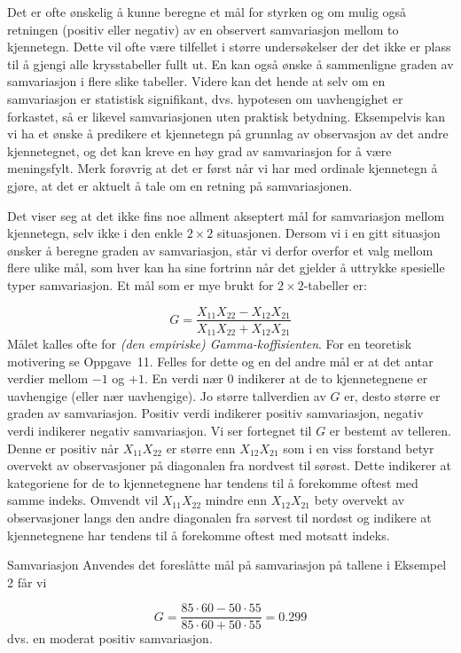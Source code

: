 Det er ofte ønskelig å kunne beregne et mål for styrken og om
mulig også retningen (positiv eller negativ) av en observert 
samvariasjon mellom to kjennetegn.  Dette vil ofte være tilfellet i
større undersøkelser der det ikke er plass til å gjengi alle
krysstabeller fullt ut.  En kan også ønske å sammenligne graden 
av samvariasjon i flere slike tabeller.  Videre kan det hende at selv om
en samvariasjon er statistisk signifikant, dvs. hypotesen om
uavhengighet er forkastet, så er likevel samvariasjonen uten
praktisk betydning.  Eksempelvis kan vi ha et ønske å predikere
et kjennetegn på grunnlag av observasjon av det andre kjennetegnet,
og det kan kreve en høy grad av samvariasjon for å være 
meningsfylt.  Merk forøvrig at det er først når vi har med
ordinale kjennetegn å gjøre, at det er aktuelt å tale om en
retning på samvariasjonen.

Det viser seg at det ikke fins noe allment akseptert mål for 
samvariasjon mellom kjennetegn, selv ikke i den enkle $2\times 2$
situasjonen.  Dersom vi i en gitt situasjon ønsker å beregne
graden av samvariasjon, står vi derfor overfor et valg mellom flere ulike
mål, som hver kan ha sine fortrinn når det gjelder å uttrykke
spesielle typer samvariasjon.  Et mål som er mye brukt for
$2\times 2$-tabeller er:

\[ G=\frac{X_{11}X_{22}-X_{12}X_{21}}{X_{11}X_{22}+X_{12}X_{21}} \]
Målet kalles ofte for {\em (den empiriske) Gamma-koffisienten}. For en
teoretisk motivering se Oppgave~11.  Felles for dette og en del andre
mål er at det antar verdier mellom $-1$ og $+1$.  En verdi nær
0 indikerer at de to kjennetegnene er uavhengige (eller nær 
uavhengige).  Jo større tallverdien av $G$ er, desto større er
graden av samvariasjon.  Positiv verdi indikerer positiv samvariasjon,
negativ verdi indikerer negativ samvariasjon.  Vi ser fortegnet til $G$
er bestemt av telleren.  Denne er positiv når $X_{11}X_{22}$ er
større enn $X_{12}X_{21}$ som i en viss forstand betyr overvekt av
observasjoner på diagonalen fra nordvest til sørøst.  Dette
indikerer at kategoriene for de to kjennetegnene har tendens til å
forekomme oftest med samme indeks.  Omvendt vil $X_{11}X_{22}$ mindre
enn $X_{12}X_{21}$ bety overvekt av observasjoner langs den andre
diagonalen fra sørvest til nordøst og indikere at kjennetegnene
har tendens til å forekomme oftest med motsatt indeks.\\

\begin{eksempel}{Samvariasjon}
Anvendes det foreslåtte mål på samvariasjon på
tallene i Eksempel 2 får vi

\[ G=\frac{85\cdot 60-50\cdot 55}{85\cdot 60+50\cdot 55}=0.299 \]
dvs. en moderat positiv samvariasjon.
\end{eksempel}

